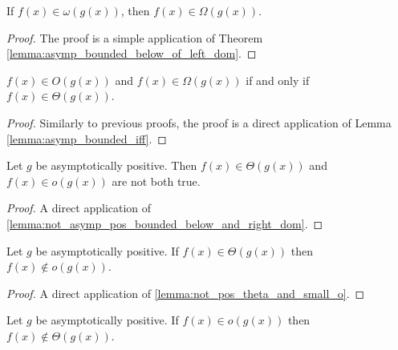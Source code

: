\begin{theorem}
    \label{thm:big_omega_of_small_omega}
    \leanok
    If $f(x) \in \omega(g(x))$, then $f(x) \in \Omega(g(x))$.
\end{theorem}

\begin{proof}
    \leanok
    The proof is a simple application of Theorem 
    \ref{lemma:asymp_bounded_below_of_left_dom}.
\end{proof}

\begin{theorem}
    \label{thm:big_o_and_omega_iff_theta}
    \leanok
    $f(x) \in O(g(x))$ and $f(x) \in \Omega(g(x))$ if and only if $f(x) \in \Theta(g(x))$.
\end{theorem}

\begin{proof}
    \leanok
    Similarly to previous proofs, the proof is a direct application of Lemma 
    \ref{lemma:asymp_bounded_iff}.
\end{proof}

\begin{lemma}
    \label{lemma:not_pos_theta_and_small_o}
    \leanok
    Let $g$ be asymptotically positive. Then $f(x) \in \Theta(g(x))$ and $f(x) \in o(g(x))$
    are not both true.
\end{lemma}

\begin{proof}
    \leanok
    A direct application of \ref{lemma:not_asymp_pos_bounded_below_and_right_dom}.
\end{proof}

\begin{lemma}
    \label{lemma:not_pos_small_o_of_theta}
    \leanok
    Let $g$ be asymptotically positive. If $f(x) \in \Theta(g(x))$ then $f(x) \notin o(g(x))$.
\end{lemma}

\begin{proof}
    \leanok
    A direct application of \ref{lemma:not_pos_theta_and_small_o}.
\end{proof}

\begin{lemma}
    \label{lemma:not_pos_theta_of_small_o}
    \leanok
    Let $g$ be asymptotically positive. If $f(x) \in o(g(x))$ then $f(x) \notin \Theta(g(x))$.
\end{lemma}

